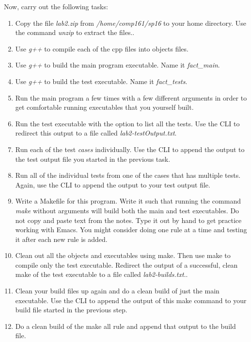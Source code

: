 \documentclass[nobib]{tufte-handout}
\begin{document}
Now, carry out the following tasks:
\begin{enumerate}
\item Copy the file \textit{lab2.zip} from \textit{/home/comp161/sp16} to your home directory. Use the command \textit{unzip} to extract the files..
\item Use \textit{g++} to compile each of the cpp files into objects files.
\item Use \textit{g++} to build the main program executable. Name it \textit{fact\_main}.
\item Use \textit{g++} to build the test executable. Name it \textit{fact\_tests}.
\item Run the main program a few times with a few different arguments in order to get comfortable running executables that you yourself built.
\item Run the test executable with the option to list all the tests. Use the CLI to redirect this output to a file called \textit{lab2-testOutput.txt}.
\item Run each of the test \textit{cases} individually. Use the CLI to append the output to the test output file you started in the previous task.
\item Run all of the individual tests from one of the cases that has multiple tests. Again, use the CLI to append the output to your test output file.
\item Write a Makefile for this program. Write it such that running the command \textit{make} without arguments will build both the main and test executables. Do not copy and paste text from the notes. Type it out by hand to get practice working with Emacs. You might consider doing one rule at a time and testing it after each new rule is added.
\item Clean out all the objects and executables using make. Then use make to compile only the test executable. Redirect the output of a successful, clean make of the test executable to a file called \textit{lab2-builds.txt}..
\item Clean your build files up again and do a clean build of just the main executable. Use the CLI to append the output of this make command to your build file started in the previous step.
\item Do a clean build of the make all rule and append that output to the build file.
\end{enumerate}
\end{document}
